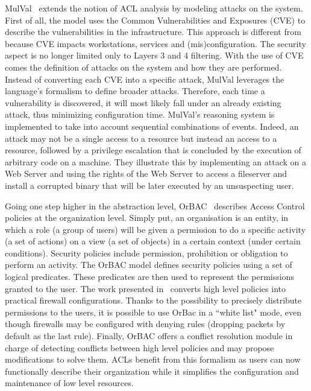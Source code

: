 MulVal~\cite{mulval-Ou2013} extends the notion of ACL analysis by modeling attacks on the system. First of all, the model uses the Common Vulnerabilities and Exposures (CVE) to describe the vulnerabilities in the infrastructure. This approach is different from~\cite{Matousek2008} because CVE impacts workstations, services and (mis)configuration. The security aspect is no longer limited only to Layers 3 and 4 filtering.
With the use of CVE comes the definition of attacks on the system and how they are performed.
Instead of converting each CVE into a specific attack, MulVal leverages the language's formalism to define broader attacks.
Therefore, each time a vulnerability is discovered, it will most likely fall under an already existing attack, thus minimizing configuration time.
MulVal's reasoning system is implemented to take into account sequential combinations of events.
Indeed, an attack may not be a single access to a resource but instead an access to a resource, followed by a privilege escalation that is concluded by the execution of arbitrary code on a machine.
They illustrate this by implementing an attack on a Web Server and using the rights of the Web Server to access a fileserver and install a corrupted binary that will be later executed by an unsuspecting user.

Going one step higher in the abstraction level, OrBAC~\cite{orbac} describes Access Control policies at the organization level. Simply put, an organisation is an entity, in which a role (\ie a group of users) will be given a permission to do a specific activity (\ie a set of actions) on a view (\ie a set of objects) in a certain context (\ie under certain conditions).
Security policies include permission, prohibition or obligation to perform an activity.
The OrBAC model defines security policies using a set of logical predicates. These predicates are then used to represent the permissions granted to the user.
The work presented in~\cite{Cuppens} converts high level policies into practical firewall configurations. Thanks to the possibility to precisely distribute permissions to the users, it is possible to use OrBac in a ``white list" mode, even though firewalls may be configured with denying rules (\ie dropping packets by default as the last rule).
Finally, OrBAC offers a conflict resolution module in charge of detecting conflicts between high level policies and may propose modifications to solve them.
ACLs benefit from this formalism as users can now functionally describe their organization while it simplifies the configuration and maintenance of low level resources.

